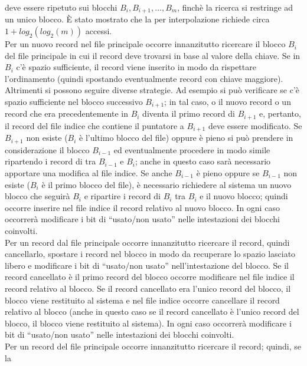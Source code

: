 deve essere ripetuto sui blocchi $B_i, B_{i+1}, \ldots, B_m$, finchè la ricerca si restringe ad un unico blocco. \`E
stato mostrato che la  per interpolazione richiede circa $1+log_2(log_2(m))$ accessi.\\
Per  un nuovo record nel file principale occorre innanzitutto ricercare il blocco $B_i$ del file
principale in cui il record deve trovarsi in base al valore della chiave. Se in $B_i$ c'è spazio sufficiente,
il record viene inserito in modo da rispettare l'ordinamento (quindi spostando eventualmente
record con chiave maggiore). Altrimenti si possono seguire diverse strategie. Ad esempio si può
verificare se c'è spazio sufficiente nel blocco successivo $B_{i+1}$; in tal caso, o il nuovo record o un
record che era precedentemente in $B_i$ diventa il primo record di $B_{i+1}$ e, pertanto, il record del file
indice che contiene il puntatore a $B_{i+1}$ deve essere modificato. Se $B_{i+1}$ non esiste ($B_i$ è l'ultimo
blocco del file) oppure è pieno si può prendere in considerazione il blocco $B_{i-1}$ ed eventualmente
procedere in modo simile ripartendo i record di tra $B_{i-1}$ e $B_i$; anche in questo caso sarà necessario
apportare una modifica al file indice. Se anche $B_{i-1}$ è pieno oppure se $B_{i-1}$ non esiste ($B_i$ è il primo
blocco del file), è necessario richiedere al sistema un nuovo blocco che seguirà $B_i$ e ripartire i
record di $B_i$ tra $B_i$ e il nuovo blocco; quindi occorre inserire nel file indice il record relativo al
nuovo blocco. In ogni caso occorrerà modificare i bit di ``usato/non usato'' nelle intestazioni dei blocchi coinvolti.\\
Per  un record dal file principale occorre innanzitutto ricercare il record, quindi
cancellarlo, spostare i record nel blocco in modo da recuperare lo spazio lasciato libero e modificare
i bit di ``usato/non usato'' nell'intestazione del blocco. Se il record cancellato è il primo record del
blocco occorre modificare nel file indice il record relativo al blocco. Se il record cancellato era
l'unico record del blocco, il blocco viene restituito al sistema e nel file indice occorre cancellare il
record relativo al blocco (anche in questo caso se il record cancellato è l'unico record del blocco, il
blocco viene restituito al sistema). In ogni caso occorrerà modificare i bit di ``usato/non usato'' nelle 
intestazioni dei blocchi coinvolti.\\
Per  un record del file principale occorre innanzitutto ricercare il record; quindi, se la

